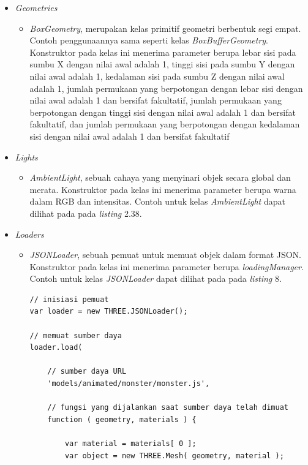 \documentclass[a4paper,twoside]{article}
\begin{document}
\begin{enumerate}
\begin{itemize}
\item \textit{Geometries}
	\begin{itemize}
	\item {\it BoxGeometry}, merupakan kelas primitif geometri berbentuk segi empat. Contoh penggunaannya sama seperti kelas {\it BoxBufferGeometry}. Konstruktor pada kelas ini menerima parameter berupa lebar sisi pada sumbu X dengan nilai awal adalah 1, tinggi sisi pada sumbu Y dengan nilai awal adalah 1, kedalaman sisi pada sumbu Z dengan nilai awal adalah 1, jumlah permukaan yang berpotongan dengan lebar sisi dengan nilai awal adalah 1 dan bersifat fakultatif,  jumlah permukaan yang berpotongan dengan tinggi sisi dengan nilai awal adalah 1 dan bersifat fakultatif,  dan jumlah permukaan yang berpotongan dengan kedalaman sisi dengan nilai awal adalah 1 dan bersifat fakultatif
	\end{itemize}
	
\item \textit{Lights}

	\begin{itemize}
	\item {\it AmbientLight}, sebuah cahaya yang menyinari objek secara global dan merata. Konstruktor pada kelas ini menerima parameter berupa warna dalam RGB dan intensitas. Contoh untuk kelas {\it AmbientLight} dapat dilihat pada pada {\it listing} 2.38.
	\end{itemize}
	
\item \textit{Loaders}

	\begin{itemize}
	\item {\it JSONLoader}, sebuah pemuat untuk memuat objek dalam format JSON. Konstruktor pada kelas ini menerima parameter berupa  {\it loadingManager}. Contoh untuk kelas {\it JSONLoader} dapat dilihat pada pada {\it listing} 8.
	
\begin{lstlisting}[caption={Contoh penggunaan kelas {\it JSONLoader}.},captionpos=b]
// inisiasi pemuat
var loader = new THREE.JSONLoader();

// memuat sumber daya
loader.load(

	// sumber daya URL
	'models/animated/monster/monster.js',

	// fungsi yang dijalankan saat sumber daya telah dimuat
	function ( geometry, materials ) {

		var material = materials[ 0 ];
		var object = new THREE.Mesh( geometry, material );


\end{lstlisting}
\end{itemize}
\end{itemize}
\end{enumerate}
\end{document}
